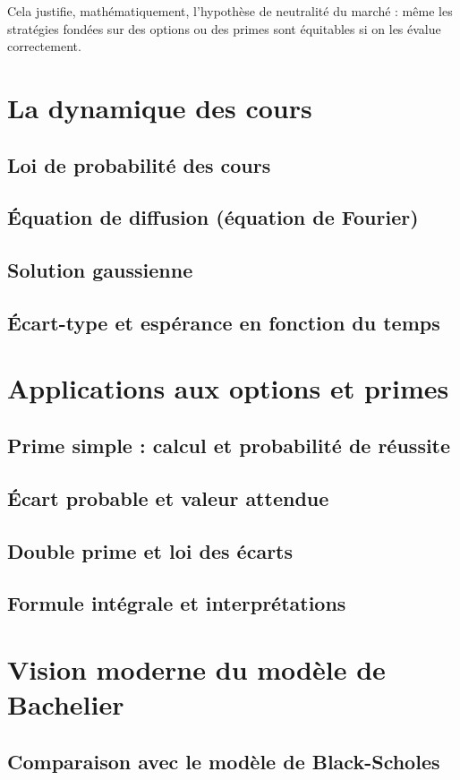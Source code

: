 \documentclass[12pt,a4paper]{article}
\begin{document}
Cela justifie, mathématiquement, l’hypothèse de neutralité du marché : même les stratégies fondées sur des options ou des primes sont équitables si on les évalue correctement.

\section{La dynamique des cours}
\subsection{Loi de probabilité des cours}
\subsection{Équation de diffusion (équation de Fourier)}
\subsection{Solution gaussienne}
\subsection{Écart-type et espérance en fonction du temps}

\section{Applications aux options et primes}
\subsection{Prime simple : calcul et probabilité de réussite}
\subsection{Écart probable et valeur attendue}
\subsection{Double prime et loi des écarts}
\subsection{Formule intégrale et interprétations}

\section{Vision moderne du modèle de Bachelier}
\subsection{Comparaison avec le modèle de Black-Scholes}
\end{document}
